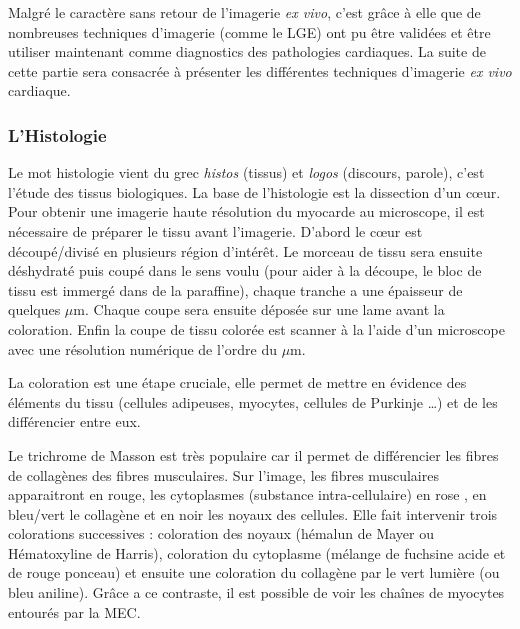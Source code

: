  Malgré le caractère sans retour de l’imagerie \textit{ex vivo}, c’est grâce à elle que de nombreuses techniques d’imagerie (comme le LGE) ont pu être validées et être utiliser maintenant comme diagnostics des pathologies cardiaques. La suite de cette partie sera consacrée à présenter les différentes techniques d’imagerie \textit{ex vivo} cardiaque.

\subsubsection{L’Histologie}

Le mot histologie vient du grec \textit{histos} (tissus) et \textit{logos} (discours, parole), c’est l’étude des tissus biologiques. La base de l’histologie est la dissection d’un cœur. Pour obtenir une imagerie haute résolution du myocarde au microscope, il est nécessaire de préparer le tissu avant l’imagerie. D’abord le cœur est découpé/divisé en plusieurs région d’intérêt. Le morceau de tissu sera ensuite déshydraté puis coupé dans le sens voulu (pour aider à la découpe, le bloc de tissu est immergé dans de la paraffine), chaque tranche a une épaisseur de quelques $\mu$m. Chaque coupe sera ensuite déposée sur une lame avant la coloration. Enfin la coupe de tissu colorée est scanner à la l’aide d’un microscope avec une résolution numérique de l’ordre du $\mu$m.

La coloration est une étape cruciale, elle permet de mettre en évidence des éléments du tissu (cellules adipeuses, myocytes, cellules de Purkinje …) et de les différencier entre eux.

Le trichrome de Masson est très populaire car il permet de différencier les fibres de collagènes des fibres musculaires. Sur l’image, les fibres musculaires apparaitront en rouge, les cytoplasmes (substance intra-cellulaire) en rose , en bleu/vert le collagène et en noir les noyaux des cellules. Elle fait intervenir trois colorations successives : coloration des noyaux (hémalun de Mayer ou Hématoxyline de Harris), coloration du cytoplasme (mélange de fuchsine acide et de rouge ponceau) et ensuite une coloration du collagène par le vert lumière (ou bleu aniline)\cite{Golberg2024}. Grâce a ce contraste, il est possible de voir les chaînes de myocytes entourés par la MEC.

